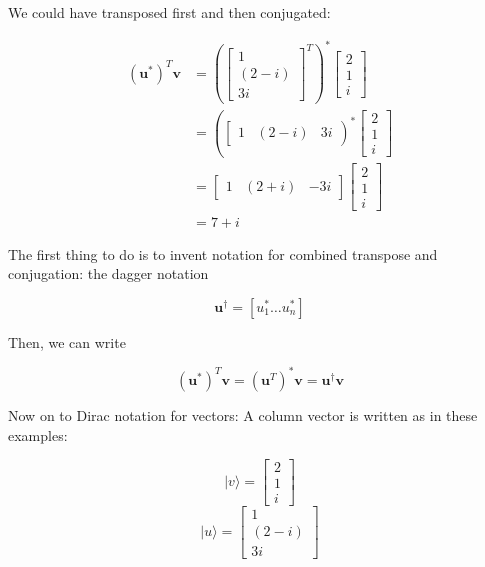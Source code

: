 \documentclass[main.tex]{subfiles}
\begin{document}
    We could have transposed first and then conjugated:
    
    $$
    \begin{aligned}
    \left(\mathbf{u}^{*}\right)^{T} \mathbf{v} &=\left(\left[\begin{array}{c}
    1 \\
    (2-i) \\
    3 i
    \end{array}\right]^{T}\right)^{*}\left[\begin{array}{l}
    2 \\
    1 \\
    i
    \end{array}\right] \\
    &=\left(\left[\begin{array}{lll}
    1 & (2-i) & 3 i
    \end{array}\right)^{*}\left[\begin{array}{l}
    2 \\
    1 \\
    i
    \end{array}\right]\right.\\
    &=\left[\begin{array}{lll}
    1 & (2+i) & -3 i
    \end{array}\right]\left[\begin{array}{l}
    2 \\
    1 \\
    i
    \end{array}\right] \\
    &=7+i
    \end{aligned}
    $$
    
    The first thing to do is to invent notation for combined transpose and conjugation: the dagger notation
    
    $$
    \mathbf{u}^{\dagger}=\left[u_{1}^{*} \ldots u_{n}^{*}\right]
    $$
    
    Then, we can write
    
    $$
    \left(\mathbf{u}^{*}\right)^{T} \mathbf{v}=\left(\mathbf{u}^{T}\right)^{*} \mathbf{v}=\mathbf{u}^{\dagger} \mathbf{v}
    $$
    
    Now on to Dirac notation for vectors: A column vector is written as in these examples:
    
    $$
    |v\rangle=\left[\begin{array}{c}
    2 \\
    1 \\
    i
    \end{array}\right]
    $$
    $$
    |u\rangle=\left[\begin{array}{c}
    1 \\
    (2-i) \\
    3 i
    \end{array}\right]
    $$
    
\end{document}
